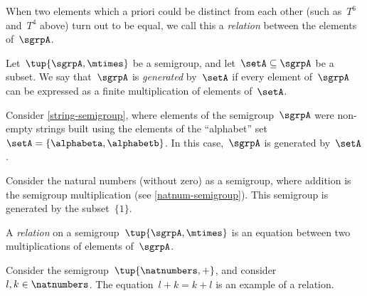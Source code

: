 When two elements which a priori could be distinct from each other (such as~$T^6$ and~$T^4$ above) turn out to be equal, we call this a \emph{relation} between the elements of~$\sgrpA$.

\begin{definition}
Let~$\tup{\sgrpA, \mtimes}$ be a semigroup, and let~$\setA \subseteq \sgrpA$ be a subset.
We say that~$\sgrpA$ is \emph{generated} by~$\setA$ if every element of~$\sgrpA$ can be expressed as a finite multiplication of elements of~$\setA$.
\end{definition}

\begin{example}
Consider \cref{string-semigroup}, where elements of the semigroup~$\sgrpA$ were non-empty strings built using the elements of the ``alphabet'' set~$\setA = \{ \alphabeta, \alphabetb\}$.
In this case,~$\sgrpA$ is generated by~$\setA$.
\end{example}


\begin{example}
Consider the natural numbers (without zero) as a semigroup, where addition is the semigroup multiplication (see \cref{natnum-semigroup}). This semigroup is generated by the subset~$\{1 \}$.
\end{example}

\begin{definition}
A \emph{relation} on a semigroup~$\tup{\sgrpA, \mtimes}$ is an equation between two multiplications of elements of~$\sgrpA$.
\end{definition}

\begin{example}
Consider the semigroup~$\tup{\natnumbers, +}$, and consider~$l, k \in \natnumbers$. The equation~$l + k = k + l$ is an example of  a relation.
\end{example}


